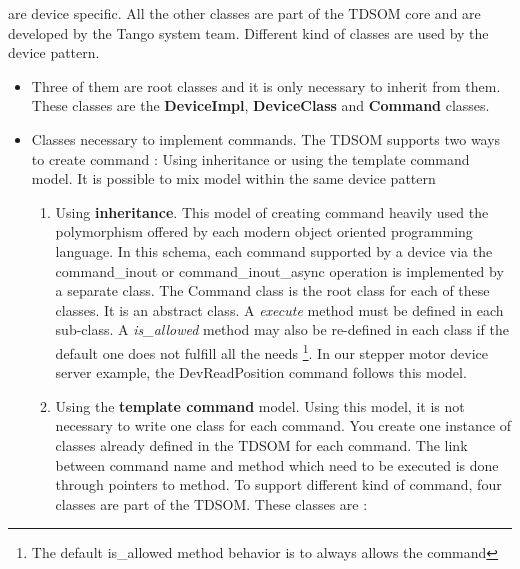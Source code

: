 are device specific. All the other classes are part of the TDSOM core
and are developed by the Tango system team. Different kind of classes
are used by the device pattern. 
\begin{itemize}
\item Three of them are root classes and it is only necessary to inherit
from them. These classes are the \textbf{DeviceImpl},
\textbf{DeviceClass} and \textbf{Command}
classes. 
\item Classes necessary to implement commands. The TDSOM
supports two ways to create command : Using inheritance
or using the template command model. It is possible
to mix model within the same device pattern

\begin{enumerate}
\item Using \textbf{inheritance}. This model of creating command heavily
used the polymorphism offered by each modern object oriented programming
language. In this schema, each command supported by a device via the
command\_inout or command\_inout\_async
operation is implemented by a separate class. The Command
class is the root class for each of these classes. It is an abstract
class. A \emph{execute} method must be defined in
each sub-class. A \emph{is\_allowed} method may
also be re-defined in each class if the default one does not fulfill
all the needs%
\footnote{The default is\_allowed method behavior is to always allows the command%
}. In our stepper motor device server example, the DevReadPosition
command follows this model.
\item Using the \textbf{template command} model. Using this model, it is
not necessary to write one class for each command. You create one
instance of classes already defined in the TDSOM for each command.
The link between command name and method which need to be executed
is done through pointers to method. To support different kind of command,
four classes are part of the TDSOM. These classes are :


\end{enumerate}
\end{itemize}
